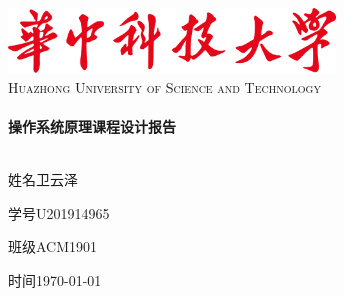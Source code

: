 \begin{titlepage}

\begin{center}


\includegraphics[width=0.65\textwidth]{figure/logo}\\[1cm]    

\textsc{\LARGE Huazhong University of Science and Technology}\\[1.5cm]



\HRule \\[0.4cm]
{ \huge \bfseries 操作系统原理课程设计报告}\\[0.4cm]

\HRule \\[1.5cm]


\begin{minipage}{0.4\textwidth}
\large
{\heiti 姓名}\quad 卫云泽

{\heiti 学号}\quad U201914965

{\heiti 班级}\quad ACM1901

{\heiti 时间}\quad \today
\end{minipage}

\vfill

\end{center}

\end{titlepage}
